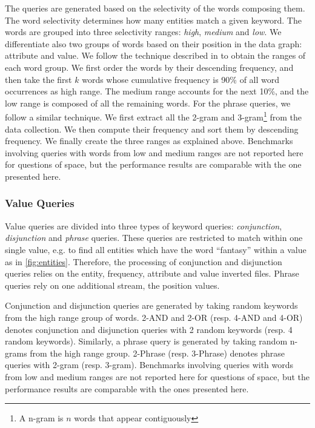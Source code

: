 The queries are generated based on the selectivity of the words composing
them. The word selectivity determines how many entities match a given keyword.
The words are grouped into three selectivity ranges: \emph{high}, \emph{medium}
and \emph{low}. We differentiate also two groups of
words based on their position in the data graph: attribute and value. We
follow the technique described in \cite{errcegovac:2005:vldb} to obtain the
ranges of each word group. We first order the words by their descending
frequency, and then take the first $k$ words whose cumulative frequency is
90\% of all word occurrences as high range. The medium range accounts for the
next 10\%, and the low range is composed of all the remaining words. For the
phrase queries, we follow a similar technique. We first extract all the 2-gram
and 3-gram\footnote{A n-gram is $n$ words that appear contiguously} from the
data collection. We then compute their frequency and sort them by descending
frequency. We finally create the three ranges as explained above. Benchmarks
involving queries with words from low and medium ranges are not reported here
for questions of space, but the performance results are comparable with the
one presented here.

\subsubsection{Value Queries}

Value queries are divided into three types of keyword queries:
\emph{conjunction}, \emph{disjunction} and \emph{phrase} queries. These queries
are restricted to match within one single value, e.g. to find all entities
which have the word ``fantasy'' within a value as in \ref{fig:entities}.
Therefore, the processing of conjunction and disjunction queries relies on the
entity, frequency, attribute and value inverted files. Phrase queries rely on
one additional stream, the position values.

Conjunction and disjunction queries are generated by taking random keywords
from the high range group of words. 2-AND and 2-OR (resp. 4-AND and 4-OR)
denotes conjunction and disjunction queries with 2 random keywords (resp. 4
random keywords). Similarly, a phrase query is generated by taking random
n-grams from the high range group. 2-Phrase (resp. 3-Phrase) denotes phrase
queries with 2-gram (resp. 3-gram). Benchmarks involving queries with words
from low and medium ranges are not reported here for questions of space, but
the performance results are comparable with the ones presented here.

